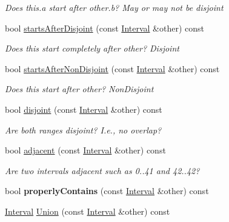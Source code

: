 \begin{DoxyCompactItemize}
\begin{DoxyCompactList}\small\item\em Does this.\+a start after other.\+b? May or may not be disjoint \end{DoxyCompactList}\item 
bool \hyperlink{classantlr4_1_1misc_1_1Interval_a9a0cc6ae72135b1bb58d86e08eef139e}{starts\+After\+Disjoint} (const \hyperlink{classantlr4_1_1misc_1_1Interval}{Interval} \&other) const
\begin{DoxyCompactList}\small\item\em Does this start completely after other? Disjoint \end{DoxyCompactList}\item 
bool \hyperlink{classantlr4_1_1misc_1_1Interval_ad2d4031fc0e21aa5342884b909ff0643}{starts\+After\+Non\+Disjoint} (const \hyperlink{classantlr4_1_1misc_1_1Interval}{Interval} \&other) const
\begin{DoxyCompactList}\small\item\em Does this start after other? Non\+Disjoint \end{DoxyCompactList}\item 
bool \hyperlink{classantlr4_1_1misc_1_1Interval_ae23f94846f2564bf62d30791568c820e}{disjoint} (const \hyperlink{classantlr4_1_1misc_1_1Interval}{Interval} \&other) const
\begin{DoxyCompactList}\small\item\em Are both ranges disjoint? I.\+e., no overlap? \end{DoxyCompactList}\item 
bool \hyperlink{classantlr4_1_1misc_1_1Interval_a1a32b591f050ea6cfafedb20106410e0}{adjacent} (const \hyperlink{classantlr4_1_1misc_1_1Interval}{Interval} \&other) const
\begin{DoxyCompactList}\small\item\em Are two intervals adjacent such as 0..41 and 42..42? \end{DoxyCompactList}\item 
\mbox{\label{classantlr4_1_1misc_1_1Interval_a77ae86e86ef757429862c1b17f82eeed}} 
bool {\bfseries properly\+Contains} (const \hyperlink{classantlr4_1_1misc_1_1Interval}{Interval} \&other) const
\item 
\hyperlink{classantlr4_1_1misc_1_1Interval}{Interval} \hyperlink{classantlr4_1_1misc_1_1Interval_a4bb5a05fa042422c5b3d2389a27288c4}{Union} (const \hyperlink{classantlr4_1_1misc_1_1Interval}{Interval} \&other) const

\end{DoxyCompactItemize}
